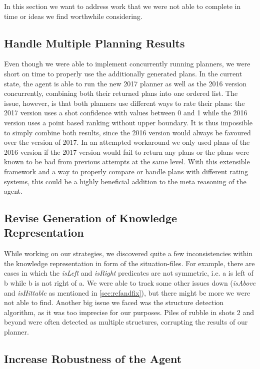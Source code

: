 In this section we want to address work that we were not able to complete in time or ideas we find worthwhile considering.

\subsection{Handle Multiple Planning Results}
\label{sec:multiple-results}

Even though we were able to implement concurrently running planners, we were short on time to properly use the additionally generated plans. In the current state, the agent is able to run the new 2017 planner as well as the 2016 version concurrently, combining both their returned plans into one ordered list. The issue, however, is that both planners use different ways to rate their plans: the 2017 version uses a shot confidence with values between 0 and 1 while the 2016 version uses a point based ranking without upper boundary. It is thus impossible to simply combine both results, since the 2016 version would always be favoured over the version of 2017. In an attempted workaround we only used plans of the 2016 version if the 2017 version would fail to return any plans or the plans were known to be bad from previous attempts at the same level. With this extensible framework and a way to properly compare or handle plans with different rating systems, this could be a highly beneficial addition to the meta reasoning of the agent.

\subsection{Revise Generation of Knowledge Representation}

While working on our strategies, we discovered quite a few inconsistencies within the knowledge representation in form of the situation-files. For example, there are cases in which the \emph{isLeft} and \emph{isRight} predicates are not symmetric, i.e. a is left of b while b is not right of a. We were able to track some other issues down (\emph{isAbove} and \emph{isHittable} as mentioned in \ref{sec:refandfix}), but there might be more we were not able to find. Another big issue we faced was the structure detection algorithm, as it was too imprecise for our purposes. Piles of rubble in shots 2 and beyond were often detected as multiple structures, corrupting the results of our planner.

\subsection{Increase Robustness of the Agent}

